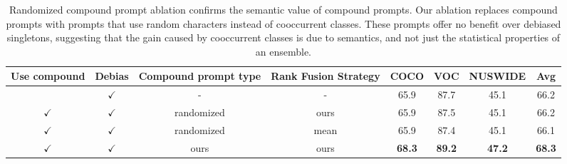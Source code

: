 \begin{table*}[t]
\centering
\begin{tabular}{cccc|ccc|c}
\toprule
Use compound &       Debias & Compound prompt type & Rank Fusion Strategy & COCO &  VOC & NUSWIDE &  Avg \\
\midrule
             & $\checkmark$ &                    - &                    - & 65.9 & 87.7 &    45.1 & 66.2 \\
$\checkmark$ & $\checkmark$ &               randomized &                 ours & 65.9 & 87.5 &    45.1 & 66.2 \\
$\checkmark$ & $\checkmark$ &               randomized &                 mean & 65.9 & 87.4 &    45.1 & 66.1 \\
$\checkmark$ & $\checkmark$ &                 ours &                 ours & \textbf{68.3} & \textbf{89.2} &    \textbf{47.2} & \textbf{68.3} \\
\bottomrule
\end{tabular}
\caption{Randomized compound prompt ablation confirms the semantic value of compound prompts. Our ablation replaces compound prompts with prompts that use random characters instead of cooccurrent classes. These prompts offer no benefit over debiased singletons, suggesting that the gain caused by cooccurrent classes is due to semantics, and not just the statistical properties of an ensemble.}
\label{tab:WaffleCLIPAblationTable}
\end{table*}
